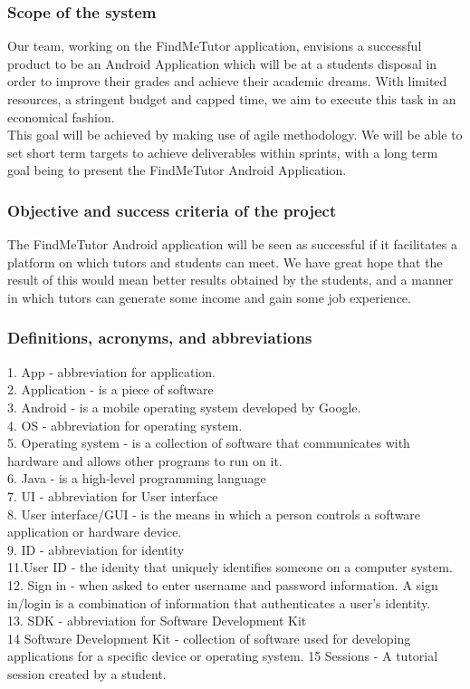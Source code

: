 \documentclass[12pt]{article}
\begin{document}
\subsubsection{Scope of the system}
\begin{flushleft}
Our team, working on the FindMeTutor application, envisions a successful product to be an Android Application which will be at a students disposal in order to improve their grades and achieve their academic dreams. With limited resources, a stringent budget and capped time, we aim to execute this task in an economical fashion.\\
This goal will be achieved by making use of agile methodology. We will be able to set short term targets to achieve deliverables within sprints, with a long term goal being to present the FindMeTutor Android Application.
\end{flushleft}
\subsubsection{Objective and success criteria of the project}
\begin{flushleft}
The FindMeTutor Android application will be seen as successful if it facilitates a platform on which tutors and students can meet. We have great hope that the result of this would mean better results obtained by the students, and a manner in which tutors can generate some income and gain some job experience.
\end{flushleft}
\subsubsection{Definitions, acronyms, and abbreviations}
1. App - abbreviation for application. \\
2. Application - is a piece of software \\
3. Android - is a mobile operating system developed by Google. \\
4. OS - abbreviation for operating system.\\
5. Operating system - is a collection of software that communicates with hardware and allows other programs to run on it.\\
6. Java - is a high-level programming language\\
7. UI - abbreviation for User interface\\
8. User interface/GUI - is the means in which a person controls a software application or hardware device.\\
9. ID - abbreviation for identity\\
11.User ID - the idenity that uniquely identifies someone on a computer system.\\
12. Sign in - when asked to enter username and password information. A sign in/login is a combination of information that authenticates a user's identity. \\
13. SDK - abbreviation for Software Development Kit\\
14 Software Development Kit -  collection of software used for developing applications for a specific device or operating system.
15 Sessions - A tutorial session created by a student.
\end{document}

